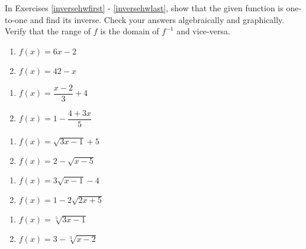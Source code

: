 In Exercises \ref{inversehwfirst} - \ref{inversehwlast}, show that the given function is one-to-one and find its inverse.  Check your answers algebraically and graphically.  Verify that the range of $f$ is the domain of $f^{-1}$ and vice-versa.

\begin{multicols}{2}
\begin{enumerate}

\item $f(x) = 6x - 2$ \label{inversehwfirst}
\item $f(x) = 42-x$


\setcounter{HW}{\value{enumi}}
\end{enumerate}
\end{multicols}


\begin{multicols}{2}
\begin{enumerate}
\setcounter{enumi}{\value{HW}}

\item $f(x) = \dfrac{x-2}{3} + 4$
\item $f(x)  = 1 - \dfrac{4+3x}{5}$


\setcounter{HW}{\value{enumi}}
\end{enumerate}
\end{multicols}


\begin{multicols}{2}
\begin{enumerate}
\setcounter{enumi}{\value{HW}}

\item $f(x) = \sqrt{3x-1}+5$
\item $f(x) = 2-\sqrt{x - 5}$

\setcounter{HW}{\value{enumi}}
\end{enumerate}
\end{multicols}

\begin{multicols}{2}
\begin{enumerate}
\setcounter{enumi}{\value{HW}}

\item $f(x) = 3\sqrt{x-1}-4$
\item $f(x) = 1 - 2\sqrt{2x+5}$


\setcounter{HW}{\value{enumi}}
\end{enumerate}
\end{multicols}

\begin{multicols}{2}
\begin{enumerate}
\setcounter{enumi}{\value{HW}}

\item $f(x) = \sqrt[5]{3x-1}$
\item $f(x) = 3-\sqrt[3]{x-2}$

\setcounter{HW}{\value{enumi}}
\end{enumerate}
\end{multicols}

